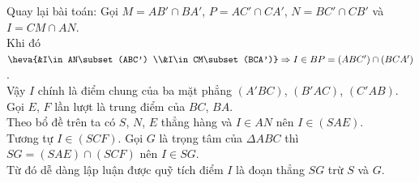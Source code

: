 \begin{ex}
{\begin{center}
		\end{center}
		Quay lại bài  toán:
		Gọi $M=AB'\cap BA'$, $P=AC'\cap CA'$, $N=BC'\cap CB'$  và $I=CM\cap AN$.\\
		Khi đó $\heva{&I\in AN\subset (ABC') \\&I\in CM\subset (BCA')}\Rightarrow  I\in BP=(ABC')\cap (BCA')$.\\
		Vậy  $I$ chính là điểm chung của ba mặt phẳng $(A'BC)$, $(B'AC)$, $(C'AB)$.\\
		Gọi $E$, $F$ lần lượt là  trung điểm của $BC$, $BA$.\\
		Theo bổ đề trên ta có $S$, $N$, $E$ thẳng hàng và  $I\in AN$ nên $I\in (SAE)$.\\
		Tương tự $I\in (SCF)$. Gọi $G$ là trọng tâm của  $\Delta ABC$ thì $SG=(SAE)\cap (SCF)$ nên $I\in SG$.\\
		Từ đó dễ dàng lập luận được quỹ tích điểm $I$ là đoạn thẳng $SG$ trừ $S$  và $G$.
	} 
\end{ex}


